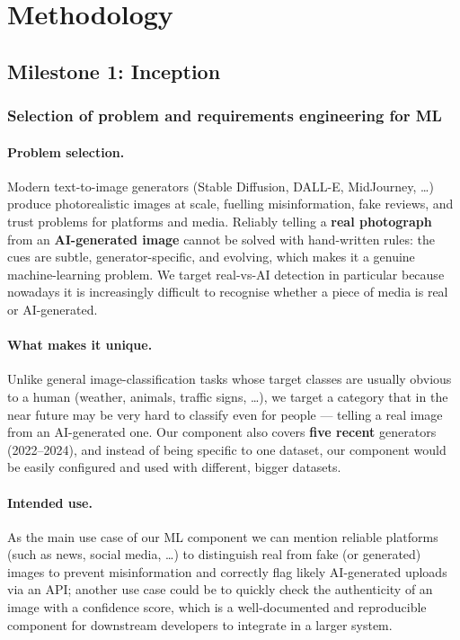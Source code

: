 \documentclass[11pt]{article}
\begin{document}
\section{Methodology}

\subsection{Milestone 1: Inception}

\subsubsection{Selection of problem and requirements engineering for ML}
\label{sec:requirements}

\paragraph{Problem selection.} Modern text-to-image generators (Stable Diffusion, DALL-E, MidJourney, \dots) produce photorealistic images at scale, fuelling misinformation, fake reviews, and trust problems for platforms and media. Reliably telling a \textbf{real photograph} from an \textbf{AI-generated image} cannot be solved with hand-written rules: the cues are subtle, generator-specific, and evolving, which makes it a genuine machine-learning problem. We target real-vs-AI detection in particular because nowadays it is increasingly difficult to recognise whether a piece of media is real or AI-generated.

\paragraph{What makes it unique.} Unlike general image-classification tasks whose target classes are usually obvious to a human (weather, animals, traffic signs, \dots), we target a category that in the near future may be very hard to classify even for people --- telling a real image from an AI-generated one. Our component also covers \textbf{five recent} generators (2022--2024), and instead of being specific to one dataset, our component would be easily configured and used with different, bigger datasets.

\paragraph{Intended use.} As the main use case of our ML component we can mention reliable platforms (such as news, social media, \dots) to distinguish real from fake (or generated) images to prevent misinformation and correctly flag likely AI-generated uploads via an API; another use case could be to quickly check the authenticity of an image with a confidence score, which is a well-documented and reproducible component for downstream developers to integrate in a larger system.
\end{document}
